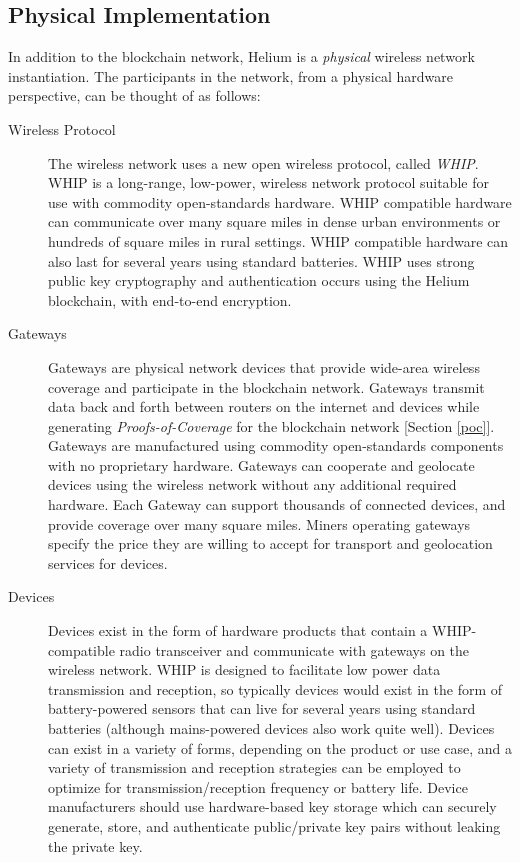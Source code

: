\documentclass[10pt, nonatbib, nocopyrightspace, reprint]{sigplanconf}
\begin{document}
\subsection{Physical Implementation}

In addition to the blockchain network, Helium is a \emph{physical} wireless network instantiation. The participants in the network, from a physical hardware perspective, can be thought of as follows:

\begin{description}
        \item [Wireless Protocol] The wireless network uses a new open wireless protocol, called \emph{WHIP}. WHIP is a long-range, low-power, wireless network protocol suitable for use with commodity open-standards hardware. WHIP compatible hardware can communicate over many square miles in dense urban environments or hundreds of square miles in rural settings. WHIP compatible hardware can also last for several years using standard batteries. WHIP uses strong public key cryptography and authentication occurs using the Helium blockchain, with end-to-end encryption.

        \item [Gateways] Gateways are physical network devices that provide wide-area wireless coverage and participate in the blockchain network. Gateways transmit data back and forth between routers on the internet and devices while generating \emph{Proofs-of-Coverage} for the blockchain network [Section \ref{poc}]. Gateways are manufactured using commodity open-standards components with no proprietary hardware. Gateways can cooperate and geolocate devices using the wireless network without any additional required hardware. Each Gateway can support thousands of connected devices, and provide coverage over many square miles. Miners operating gateways specify the price they are willing to accept for transport and geolocation services for devices.

        \item [Devices] Devices exist in the form of hardware products that contain a WHIP-compatible radio transceiver and communicate with gateways on the wireless network. WHIP is designed to facilitate low power data transmission and reception, so typically devices would exist in the form of battery-powered sensors that can live for several years using standard batteries (although mains-powered devices also work quite well). Devices can exist in a variety of forms, depending on the product or use case, and a variety of transmission and reception strategies can be employed to optimize for transmission/reception frequency or battery life. Device manufacturers should use hardware-based key storage which can securely generate, store, and authenticate public/private key pairs without leaking the private key.
\end{description}
\end{document}
